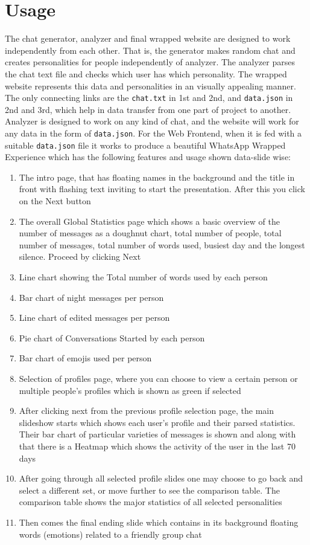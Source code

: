 \documentclass[12pt]{extarticle}
\begin{document}
\section{Usage}
The chat generator, analyzer and final wrapped website are designed to work independently from each other. That is, the generator makes random chat and creates personalities for people independently of analyzer. The analyzer parses the chat text file and checks which user has which personality. The wrapped website represents this data and personalities in an visually appealing manner. The only connecting links are the \texttt{chat.txt} in 1st and 2nd, and \texttt{data.json} in 2nd and 3rd, which help in data transfer from one part of project to another. Analyzer is designed to work on any kind of chat, and the website will work for any data in the form of \texttt{data.json}.
For the Web Frontend, when it is fed with a suitable \texttt{data.json} file it works to produce a beautiful WhatsApp Wrapped Experience which has the following features and usage shown data-slide wise:
\begin{enumerate}
    \item The intro page, that has floating names in the background and the title in front with flashing text inviting to start the presentation. After this you click on the Next button
    \item The overall Global Statistics page which shows a basic overview of the number of messages as a doughnut chart, total number of people, total number of messages, total number of words used, busiest day and the longest silence. Proceed by clicking Next
    \item Line chart showing the Total number of words used by each person
    \item Bar chart of night messages per person
    \item Line chart of edited messages per person
    \item Pie chart of Conversations Started by each person
    \item Bar chart of emojis used per person
    \item Selection of profiles page, where you can choose to view a certain person or multiple people's profiles which is shown as green if selected
    \item After clicking next from the previous profile selection page, the main slideshow starts which shows each user's profile and their parsed statistics. Their bar chart of particular varieties of messages is shown and along with that there is a Heatmap which shows the activity of the user in the last 70 days
    \item After going through all selected profile slides one may choose to go back and select a different set, or move further to see the comparison table. The comparison table shows the major statistics of all selected personalities
    \item Then comes the final ending slide which contains in its background floating words (emotions) related to a friendly group chat
\end{enumerate}
\end{document}

